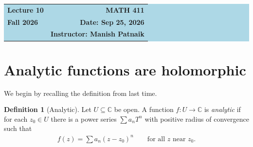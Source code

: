 \documentclass[11pt]{article}
\theoremstyle{plain}
\theoremstyle{definition}
\newtheorem{definition}[theorem]{Definition}
\theoremstyle{remark}
\numberwithin{equation}{section}
\newcommand{\be}{\begin{eqnarray}}
\newcommand{\ee}{\end{eqnarray}}
\newcommand{\C}{\mathbb{C}}
\begin{document}
\begin{center}
  \colorbox{lightblue}{%
    \begin{minipage}{0.94\textwidth}
      \vspace{0.55em}
      \begin{tabular*}{\textwidth}{@{\extracolsep{\fill}}lr}
        {\color{courseblue}\bfseries\LARGE Lecture 10} &
        {\color{courseblue}\bfseries\LARGE MATH 411}\\[0.35em]
        \textbf{Fall 2026} & \textbf{Date: Sep 25, 2026}\\
        & \textbf{Instructor: Manish Patnaik}
      \end{tabular*}
      \vspace{0.45em}
    \end{minipage}}
\end{center}

\setcounter{tocdepth}{1}
\tableofcontents
\vspace{0.45em}

\section{Analytic functions are holomorphic}
We begin by recalling the definition from last time.

\noindent
\begin{minipage}[c]{0.62\textwidth}
\begin{definition}[Analytic]
\label{def:analytic}
Let $U\subseteq\C$ be open. A function $f\colon U\to\C$ is
\emph{analytic} if for each $z_0\in U$ there is a power series
$\sum a_nT^n$ with positive radius of convergence such that
\be
 f(z)=\sum a_n(z-z_0)^n\qquad\text{for all $z$ near $z_0$}.
\ee
\end{definition}
\end{minipage}\hfill
\begin{minipage}[c]{0.34\textwidth}
\centering
{}
\end{minipage}
\end{document}
